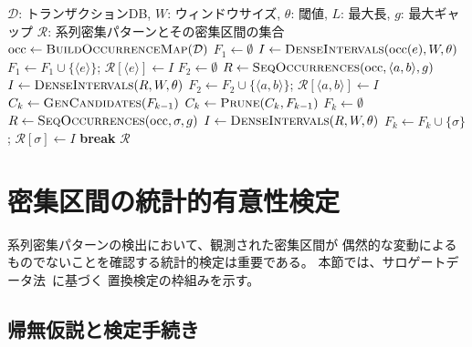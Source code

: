 \documentclass[11pt,a4paper]{article}
\begin{document}
\begin{algorithm}[t]
\caption{系列密集パターンマイニング（SDP-Miner）}
\label{alg:sdp}
\begin{algorithmic}[1]
\Require $\mathcal{D}$: トランザクションDB, $W$: ウィンドウサイズ, $\theta$: 閾値, $L$: 最大長, $g$: 最大ギャップ
\Ensure $\mathcal{R}$: 系列密集パターンとその密集区間の集合
\State $\mathrm{occ} \gets \textsc{BuildOccurrenceMap}(\mathcal{D})$
\State $F_1 \gets \emptyset$
  \State $I \gets \textsc{DenseIntervals}(\mathrm{occ}(e), W, \theta)$
    \State $F_1 \gets F_1 \cup \{\langle e \rangle\}$; $\mathcal{R}[\langle e \rangle] \gets I$
  \EndIf
\EndFor
\State $F_2 \gets \emptyset$
 
  \State $R \gets \textsc{SeqOccurrences}(\mathrm{occ}, \langle a, b \rangle, g)$
  \State $I \gets \textsc{DenseIntervals}(R, W, \theta)$
    \State $F_2 \gets F_2 \cup \{\langle a, b \rangle\}$; $\mathcal{R}[\langle a,b \rangle] \gets I$
  \EndIf
\EndFor
{}
  \State $C_k \gets \textsc{GenCandidates}(F_{k-1})$ 
  \State $C_k \gets \textsc{Prune}(C_k, F_{k-1})$ 
  \State $F_k \gets \emptyset$
    \State $R \gets \textsc{SeqOccurrences}(\mathrm{occ}, \sigma, g)$
    \State $I \gets \textsc{DenseIntervals}(R, W, \theta)$
      \State $F_k \gets F_k \cup \{\sigma\}$; $\mathcal{R}[\sigma] \gets I$
    \EndIf
  \EndFor
   \textbf{break} \EndIf
\EndFor
\State \Return $\mathcal{R}$
\end{algorithmic}
\end{algorithm}

\section{密集区間の統計的有意性検定}
\label{sec:significance}

系列密集パターンの検出において、観測された密集区間が
偶然的な変動によるものでないことを確認する統計的検定は重要である。
本節では、サロゲートデータ法~\cite{Lancaster2018}に基づく
置換検定の枠組みを示す。

\subsection{帰無仮説と検定手続き}
\end{document}
